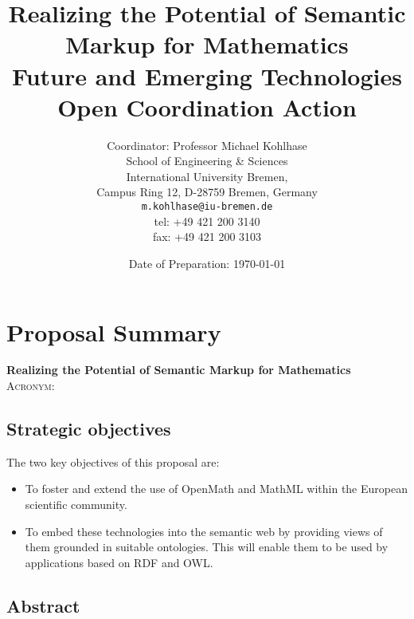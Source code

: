 \documentclass{euproposal}
\begin{document}
\setcounter{part}{2}%




\title{Realizing the Potential of Semantic  Markup for Mathematics\\
  \normalfont\large Future and Emerging Technologies Open Coordination
  Action}

\date{Date of Preparation: \today}
\author{Coordinator: Professor Michael Kohlhase\\
  School of Engineering \& Sciences\\
  International University Bremen, \\
  Campus Ring 12, D-28759 Bremen, Germany\\ 
\texttt{m.kohlhase@iu-bremen.de}\\
tel: +49 421 200 3140 \\ fax: +49 421 200 3103} 


\titlepage 

\maketitle
\showednotestrue
\newpage
\tableofcontents

\setcounter{chapter}{0}

\section{Proposal Summary}

\textbf{Realizing the Potential of Semantic Markup for Mathematics}\\
\textsc{Acronym:} \\


\subsection{Strategic objectives}

The two key objectives of this proposal are:
\begin{itemize}
\item To foster and extend the use of OpenMath and MathML within the
  European scientific community.
\item To embed these technologies into the semantic web by providing
  views of them grounded in suitable ontologies.  This will enable
  them to be used by applications based on RDF and OWL.
\end{itemize}


\subsection{Abstract}
\end{document}
